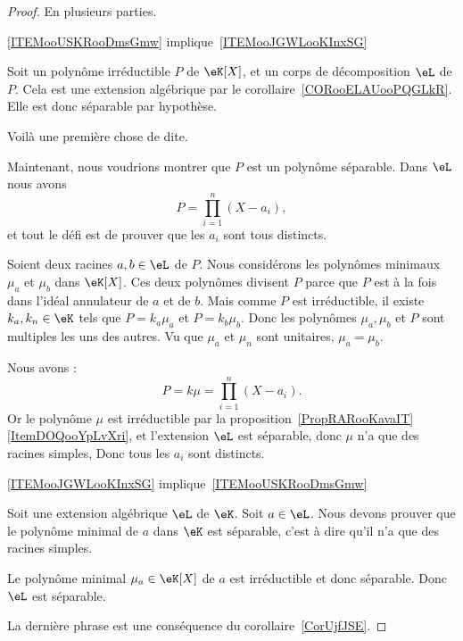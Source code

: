 \begin{proof}

    En plusieurs parties.

    \begin{subproof}
        \item[\ref{ITEMooUSKRooDmsGmw} implique~\ref{ITEMooJGWLooKInxSG}]

            Soit un polynôme irréductible \( P\) de \( \eK[X]\), et un corps de décomposition \( \eL\) de \( P\). Cela est une extension algébrique par le corollaire~\ref{CORooELAUooPQGLkR}. Elle est donc séparable par hypothèse.

            Voilà une première chose de dite.

            Maintenant, nous voudrions montrer que \( P\) est un polynôme séparable. Dans \( \eL\) nous avons
            \begin{equation}
                P=\prod_{i=1}^n(X-a_i),
            \end{equation}
            et tout le défi est de prouver que les \( a_i\) sont tous distincts.

            Soient deux racines \( a,b\in \eL\) de \( P\). Nous considérons les polynômes minimaux \( \mu_a\) et \( \mu_b\) dans \( \eK[X]\). Ces deux polynômes divisent \( P\) parce que \( P\) est à la fois dans l'idéal annulateur de \( a\) et de \( b\). Mais comme \( P\) est irréductible, il existe \( k_a,k_n\in \eK\) tels que \( P=k_a\mu_a\) et \( P=k_b\mu_b\). Donc les polynômes \( \mu_a,\mu_b\) et \( P\) sont multiples les uns des autres. Vu que \( \mu_a\) et \( \mu_n\) sont unitaires, \( \mu_a=\mu_b\).

            Nous avons :
            \begin{equation}
                P=k\mu=\prod_{i=1}^n(X-a_i).
            \end{equation}
            Or le polynôme \( \mu\) est irréductible par la proposition~\ref{PropRARooKavaIT}\ref{ItemDOQooYpLvXri}, et l'extension \( \eL\) est séparable, donc \( \mu\) n'a que des racines simples, Donc tous les \( a_i\) sont distincts.

        \item[\ref{ITEMooJGWLooKInxSG} implique~\ref{ITEMooUSKRooDmsGmw}]

            Soit une extension algébrique \( \eL\) de \( \eK\). Soit \( a\in \eL\). Nous devons prouver que le polynôme minimal de \( a\) dans \( \eK\) est séparable, c'est à dire qu'il n'a que des racines simples.

            Le polynôme minimal \( \mu_a\in \eK[X]\) de \( a\) est irréductible et donc séparable. Donc \( \eL\) est séparable.

    \end{subproof}

    La dernière phrase est une conséquence du corollaire~\ref{CorUjfJSE}.
\end{proof}

